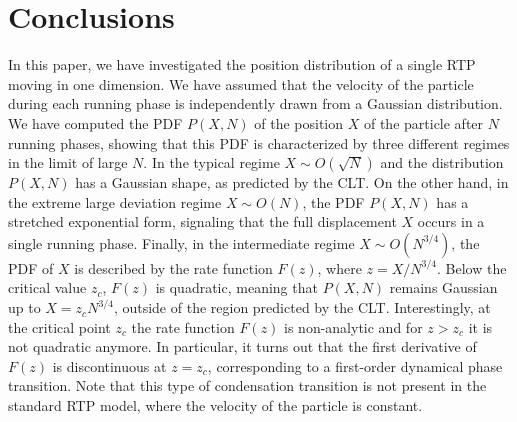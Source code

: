 \documentclass[aps,pre,twocolumn,superscriptaddress,showpacs]{revtex4-1}
\begin{document}
\section{Conclusions}

\label{sec:conclusions}



In this paper, we have investigated the position distribution of a single RTP moving in one dimension. We have assumed that the velocity of the particle during each running phase is independently drawn from a Gaussian distribution. We have computed the PDF $P(X,N)$ of the position $X$ of the particle after $N$ running phases, showing that this PDF is characterized by three different regimes in the limit of large $N$. In the typical regime $X\sim O(\sqrt{N})$ and the distribution $P(X,N)$ has a Gaussian shape, as predicted by the CLT. On the other hand, in the extreme large deviation regime $X\sim O(N)$, the PDF $P(X,N)$ has a stretched exponential form, signaling that the full displacement $X$ occurs in a single running phase. Finally, in the intermediate regime $X\sim O(N^{3/4})$, the PDF of $X$ is described by the rate function $F(z)$, where $z=X/N^{3/4}$. Below the critical value $z_c$, $F(z)$ is quadratic, meaning that $P(X,N)$ remains Gaussian up to $X=z_c N^{3/4}$, outside of the region predicted by the CLT. Interestingly, at the critical point $z_c$ the rate function $F(z)$ is non-analytic and for $z>z_c$ it is not quadratic anymore. In particular, it turns out that the first derivative of $F(z)$ is discontinuous at $z=z_c$, corresponding to a first-order dynamical phase transition. Note that this type of condensation transition is not present in the standard RTP model, where the velocity of the particle is constant.
\end{document}
